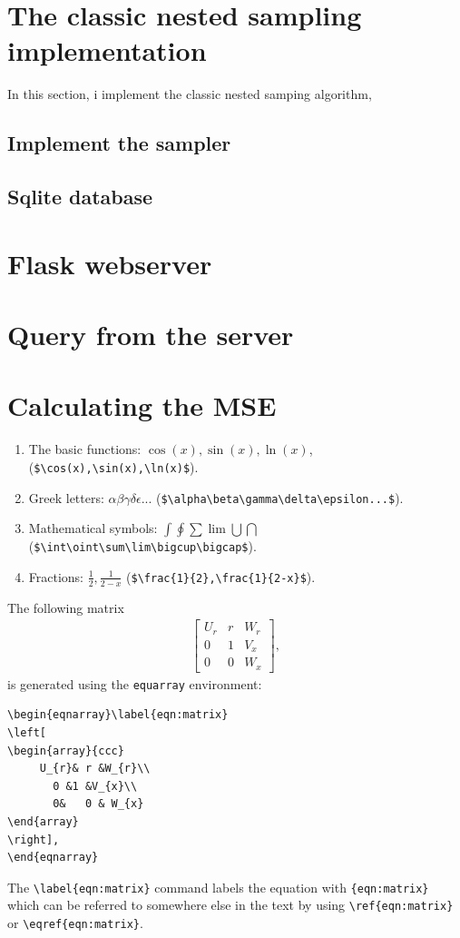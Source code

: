 \documentclass[11pt]{book}
\begin{document}
\section{The classic nested sampling implementation}
In this section, i implement the classic nested samping algorithm, 
\subsection{Implement the sampler}
\subsection{Sqlite database}


\section{Flask webserver}
\section{Query from the server}
\section{Calculating the MSE}




\begin{enumerate}
\item The basic functions: $\cos(x),  \sin(x),   \ln(x) $,  (\verb+$\cos(x),\sin(x),\ln(x)$+). 
\item Greek letters: $\alpha \beta \gamma \delta\epsilon...$ (\verb+$\alpha\beta\gamma\delta\epsilon...$+).
\item Mathematical symbols: $\int  \oint \sum\lim\bigcup \bigcap$
 (\verb+$\int\oint\sum\lim\bigcup\bigcap$+).
\item Fractions: $\frac{1}{2},\frac{1}{2-x}$ (\verb+$\frac{1}{2},\frac{1}{2-x}$+).
\end{enumerate}

The following matrix 
\begin{eqnarray}\label{eqn:matrix}
\left[
\begin{array}{ccc}
	 U_{r}&     r       &   W_{r}	\\
	   0       &	1      &  V_{x}	\\
	   0	   &	0      &  W_{x}
\end{array}
\right], 
\end{eqnarray}
is generated using  the \verb+equarray+ environment:
\begin{verbatim}
\begin{eqnarray}\label{eqn:matrix}
\left[
\begin{array}{ccc}
	 U_{r}& r &W_{r}\\
	   0 &1 &V_{x}\\
	   0&	0 & W_{x}
\end{array}
\right], 
\end{eqnarray}
\end{verbatim}
The \verb+\label{eqn:matrix}+ command labels the equation with \verb+{eqn:matrix}+ which can 
be referred  to somewhere else in the text by using \verb+\ref{eqn:matrix}+ or  \verb+\eqref{eqn:matrix}+.
\end{document}
